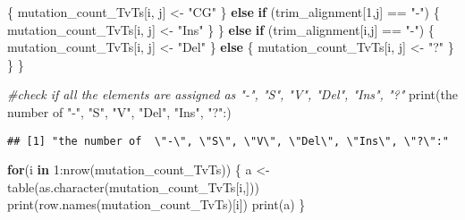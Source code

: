 \documentclass[
]{article}
\newenvironment{Shaded}{\begin{snugshade}}{\end{snugshade}}
\newcommand{\CommentTok}[1]{\textcolor[rgb]{0.56,0.35,0.01}{\textit{#1}}}
\newcommand{\ControlFlowTok}[1]{\textcolor[rgb]{0.13,0.29,0.53}{\textbf{#1}}}
\newcommand{\DecValTok}[1]{\textcolor[rgb]{0.00,0.00,0.81}{#1}}
\newcommand{\FunctionTok}[1]{\textcolor[rgb]{0.00,0.00,0.00}{#1}}
\newcommand{\NormalTok}[1]{#1}
\newcommand{\OtherTok}[1]{\textcolor[rgb]{0.56,0.35,0.01}{#1}}
\newcommand{\SpecialCharTok}[1]{\textcolor[rgb]{0.00,0.00,0.00}{#1}}
\newcommand{\StringTok}[1]{\textcolor[rgb]{0.31,0.60,0.02}{#1}}
\begin{document}
\begin{Shaded}
\begin{Highlighting}[]
\NormalTok{      \{}
\NormalTok{        mutation\_count\_TvTs[i, j] }\OtherTok{\textless{}{-}} \StringTok{"CG"}
\NormalTok{      \}}
      \ControlFlowTok{else} \ControlFlowTok{if}\NormalTok{ (trim\_alignment[}\DecValTok{1}\NormalTok{,j] }\SpecialCharTok{==} \StringTok{"{-}"}\NormalTok{)}
\NormalTok{      \{}
\NormalTok{        mutation\_count\_TvTs[i, j] }\OtherTok{\textless{}{-}} \StringTok{"Ins"}
\NormalTok{      \}}
\NormalTok{    \}}
    \ControlFlowTok{else} \ControlFlowTok{if}\NormalTok{ (trim\_alignment[i,j] }\SpecialCharTok{==} \StringTok{"{-}"}\NormalTok{)}
\NormalTok{    \{}
\NormalTok{      mutation\_count\_TvTs[i, j] }\OtherTok{\textless{}{-}} \StringTok{"Del"}
\NormalTok{    \}  }
    \ControlFlowTok{else}
\NormalTok{    \{}
\NormalTok{      mutation\_count\_TvTs[i, j] }\OtherTok{\textless{}{-}} \StringTok{"?"}
\NormalTok{    \}  }
\NormalTok{  \}}
\NormalTok{\}}

\CommentTok{\#check if all the elements are assigned as "{-}", "S", "V", "Del", "Ins", "?"}
\FunctionTok{print}\NormalTok{(}\StringTok{\textquotesingle{}the number of  "{-}", "S", "V", "Del", "Ins", "?":\textquotesingle{}}\NormalTok{)}
\end{Highlighting}
\end{Shaded}

\begin{verbatim}
## [1] "the number of  \"-\", \"S\", \"V\", \"Del\", \"Ins\", \"?\":"
\end{verbatim}

\begin{Shaded}
\begin{Highlighting}[]
\ControlFlowTok{for}\NormalTok{(i }\ControlFlowTok{in} \DecValTok{1}\SpecialCharTok{:}\FunctionTok{nrow}\NormalTok{(mutation\_count\_TvTs))}
\NormalTok{\{}
\NormalTok{  a }\OtherTok{\textless{}{-}} \FunctionTok{table}\NormalTok{(}\FunctionTok{as.character}\NormalTok{(mutation\_count\_TvTs[i,]))}
  \FunctionTok{print}\NormalTok{(}\FunctionTok{row.names}\NormalTok{(mutation\_count\_TvTs)[i])}
  \FunctionTok{print}\NormalTok{(a)}
\NormalTok{\}}
\end{Highlighting}
\end{Shaded}
\end{document}
